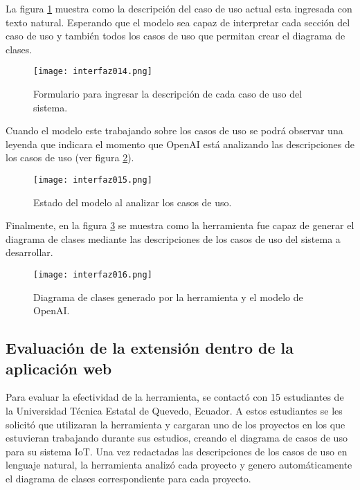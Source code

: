 La figura \ref{fig:cap3_interfaz_014} muestra como la descripción del caso de uso actual esta ingresada con texto natural. Esperando que el modelo sea capaz de interpretar cada sección del caso de uso y también todos los casos de uso que permitan crear el diagrama de clases. 

 \begin{figure}[H]  
	\centering
	\texttt{[image: interfaz014.png]} 
	\caption{Formulario para ingresar la descripción de cada caso de uso del sistema.}
	\label{fig:cap3_interfaz_014}
\end{figure}

Cuando el modelo este trabajando sobre los casos de uso se podrá observar una leyenda que indicara el momento que OpenAI está analizando las descripciones de los casos de uso (ver figura \ref{fig:cap3_interfaz_015}). 

 \begin{figure}[H]  
	\centering
	\texttt{[image: interfaz015.png]} 
	\caption{Estado del modelo al analizar los casos de uso.}
	\label{fig:cap3_interfaz_015}
\end{figure}

Finalmente, en la figura \ref{fig:cap3_interfaz_016} se muestra como la herramienta fue capaz de generar el diagrama de clases mediante las descripciones de los casos de uso del sistema a desarrollar.

 \begin{figure}[H]  
	\centering
	\texttt{[image: interfaz016.png]} 
	\caption{Diagrama de clases generado por la herramienta y el modelo de OpenAI.}
	\label{fig:cap3_interfaz_016}
\end{figure}

\subsection{Evaluación de la extensión dentro de la aplicación web}

Para evaluar la efectividad de la herramienta, se contactó con 15 estudiantes de la Universidad Técnica Estatal de Quevedo, Ecuador. A estos estudiantes se les solicitó que utilizaran la herramienta y cargaran uno de los proyectos en los que estuvieran trabajando durante sus estudios, creando el diagrama de casos de uso para su sistema IoT. Una vez redactadas las descripciones de los casos de uso en lenguaje natural, la herramienta analizó cada proyecto y genero automáticamente el diagrama de clases correspondiente para cada proyecto.

